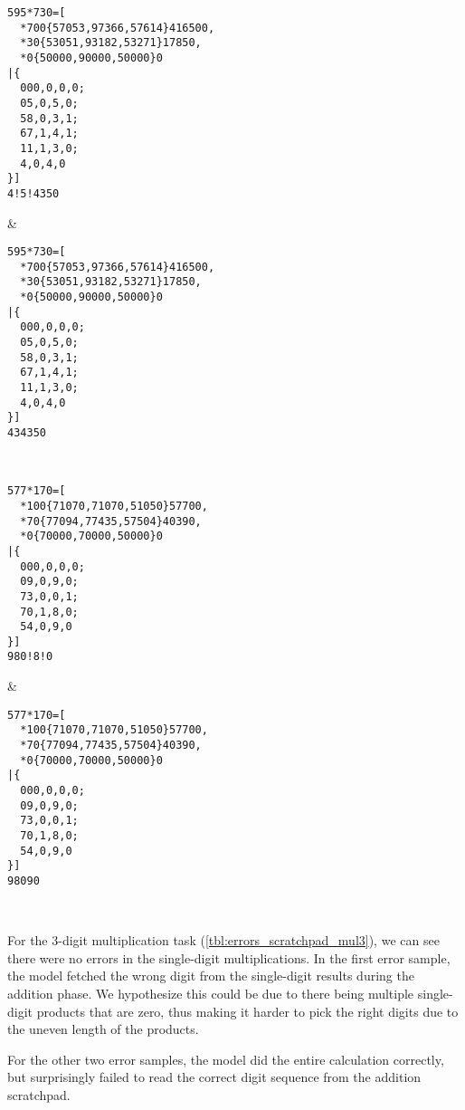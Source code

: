 \begin{lstlisting}
595*730=[
  *700{57053,97366,57614}416500,
  *30{53051,93182,53271}17850,
  *0{50000,90000,50000}0
|{
  000,0,0,0;
  05,0,5,0;
  58,0,3,1;
  67,1,4,1;
  11,1,3,0;
  4,0,4,0
}]
4!5!4350
\end{lstlisting} &
\begin{lstlisting}
595*730=[
  *700{57053,97366,57614}416500,
  *30{53051,93182,53271}17850,
  *0{50000,90000,50000}0
|{
  000,0,0,0;
  05,0,5,0;
  58,0,3,1;
  67,1,4,1;
  11,1,3,0;
  4,0,4,0
}]
434350
\end{lstlisting} \\ \ErrorAnalysisTableRule

\begin{lstlisting}
577*170=[
  *100{71070,71070,51050}57700,
  *70{77094,77435,57504}40390,
  *0{70000,70000,50000}0
|{
  000,0,0,0;
  09,0,9,0;
  73,0,0,1;
  70,1,8,0;
  54,0,9,0
}]
980!8!0
\end{lstlisting} &
\begin{lstlisting}
577*170=[
  *100{71070,71070,51050}57700,
  *70{77094,77435,57504}40390,
  *0{70000,70000,50000}0
|{
  000,0,0,0;
  09,0,9,0;
  73,0,0,1;
  70,1,8,0;
  54,0,9,0
}]
98090
\end{lstlisting} \\


For the 3-digit multiplication task (\cref{tbl:errors_scratchpad_mul3}), we can see there were no errors in the single-digit multiplications. In the first error sample, the model fetched the wrong digit from the single-digit results during the addition phase. We hypothesize this could be due to there being multiple single-digit products that are zero, thus making it harder to pick the right digits due to the uneven length of the products.

For the other two error samples, the model did the entire calculation correctly, but surprisingly failed to read the correct digit sequence from the addition scratchpad.


\ErrorAnalysisTableBegin

